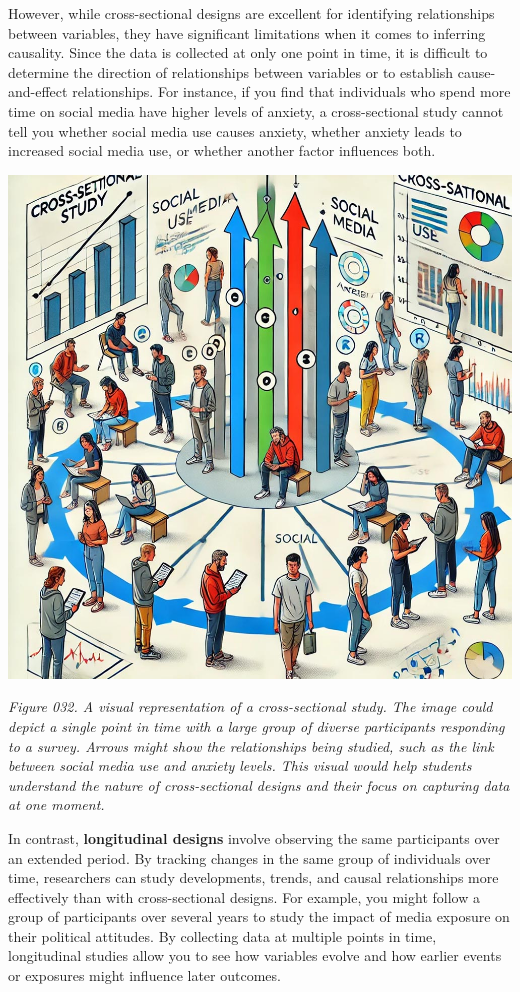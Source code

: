 \documentclass[
]{book}
\begin{document}
However, while cross-sectional designs are excellent for identifying relationships between variables, they have significant limitations when it comes to inferring causality. Since the data is collected at only one point in time, it is difficult to determine the direction of relationships between variables or to establish cause-and-effect relationships. For instance, if you find that individuals who spend more time on social media have higher levels of anxiety, a cross-sectional study cannot tell you whether social media use causes anxiety, whether anxiety leads to increased social media use, or whether another factor influences both.

\includegraphics[width=1\textwidth,height=\textheight]{images/fig032.jpg}

\emph{Figure 032. A visual representation of a cross-sectional study. The image could depict a single point in time with a large group of diverse participants responding to a survey. Arrows might show the relationships being studied, such as the link between social media use and anxiety levels. This visual would help students understand the nature of cross-sectional designs and their focus on capturing data at one moment.}

In contrast, \textbf{longitudinal designs} involve observing the same participants over an extended period. By tracking changes in the same group of individuals over time, researchers can study developments, trends, and causal relationships more effectively than with cross-sectional designs. For example, you might follow a group of participants over several years to study the impact of media exposure on their political attitudes. By collecting data at multiple points in time, longitudinal studies allow you to see how variables evolve and how earlier events or exposures might influence later outcomes.
\end{document}

